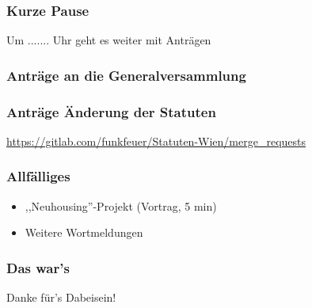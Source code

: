 \documentclass[17pt]{beamer} %
\begin{document}
\begin{frame}
	\frametitle{Kurze Pause}
	Um ....... Uhr geht es weiter mit Anträgen
\end{frame}



\begin{frame}
	\frametitle{Anträge an die Generalversammlung}
\end{frame}



\begin{frame}
	\frametitle{Anträge Änderung der Statuten}
	\url{https://gitlab.com/funkfeuer/Statuten-Wien/merge_requests}
\end{frame}



\begin{frame}
	\frametitle{Allfälliges}
	\begin{itemize}
		\item ,,Neuhousing''-Projekt (Vortrag, 5 min)
		\item Weitere Wortmeldungen
	\end{itemize}
\end{frame}



\begin{frame}
	\frametitle{Das war's}
	Danke für's Dabeisein!
\end{frame}

\end{document}
